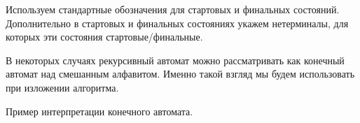 Используем стандартные обозначения для стартовых и финальных состояний.
Дополнительно в стартовых и финальных состояниях укажем нетерминалы, для которых эти состояния стартовые/финальные.

В некоторых случаях рекурсивный автомат можно рассматривать как конечный автомат над смешанным алфавитом.
Именно такой взгляд мы будем использовать при изложении алгоритма.

Пример интерпретации конечного автомата.



